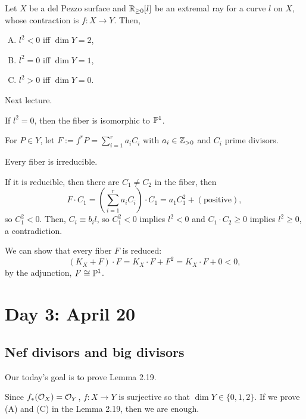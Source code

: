 \documentclass{../../small}
\begin{document}
\begin{lem}
Let $X$ be a del Pezzo surface and $\R_{\ge0}[l]$ be an extremal ray for a curve $l$ on $X$, whose contraction is $f:X\to Y$.
Then,
\begin{enumerate}[(A)]
\item $l^2<0$ iff $\dim Y=2$,
\item $l^2=0$ iff $\dim Y=1$,
\item $l^2>0$ iff $\dim Y=0$.
\end{enumerate}
\end{lem}
\begin{pf}
Next lecture.
\end{pf}

\begin{prop}[(B)]
If $l^2=0$, then the fiber is isomorphic to $\P^1$.
\end{prop}
\begin{pf}
For $P\in Y$, let $F:=f^*P=\sum_{i=1}^ra_iC_i$ with $a_i\in\Z_{>0}$ and $C_i$ prime divisors.
\begin{clm}
Every fiber is irreducible.
\end{clm}
\begin{pf}
If it is reducible, then there are $C_1\ne C_2$ in the fiber, then
\[F\cdot C_1=(\sum_{i=1}^ra_iC_i)\cdot C_1=a_1C_1^2+(\text{positive}),\]
so $C_1^2<0$.
Then, $C_i\equiv b_il$, so $C_1^2<0$ implies $l^2<0$ and $C_1\cdot C_2\ge0$ implies $l^2\ge0$, a contradiction.
\end{pf}
We can show that every fiber $F$ is reduced:
\[(K_X+F)\cdot F=K_X\cdot F+F^2=K_X\cdot F+0<0,\]
by the adjunction, $F\cong\P^1$.
\end{pf}



\newpage
\section{Day 3: April 20}

\subsection*{Nef divisors and big divisors}
Our today's goal is to prove Lemma 2.19.


\begin{rmk}
Since $f_*(\cO_X)=\cO_Y$, $f:X\to Y$ is surjective so that $\dim Y\in\{0,1,2\}$.
If we prove (A) and (C) in the Lemma 2.19, then we are enough.
\end{rmk}
\end{document}
